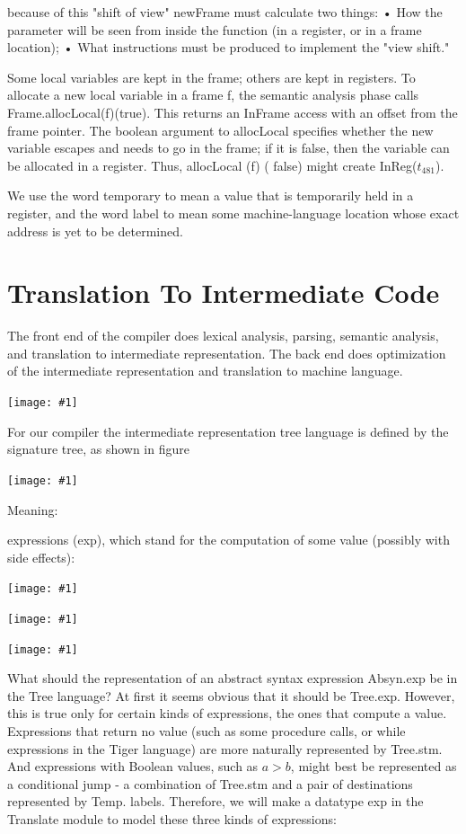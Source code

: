 \documentclass[8pt, a4paper, oneside, twocolumn]{extarticle}
\newcommand{\ph}[1]{
    \texttt{[image: \#1]}
}
\begin{document}
because of this "shift of view" newFrame must calculate two things:
• How the parameter will be seen from inside the function (in a register, or in a
frame location);
• What instructions must be produced to implement the "view shift."

Some local variables are kept in the frame; others are kept in registers. To
allocate a new local variable in a frame f, the semantic analysis phase calls
Frame.allocLocal(f)(true). This returns an InFrame access with an offset from the frame pointer.
The boolean argument to allocLocal specifies whether the new 
variable escapes and needs to go in the frame; if it is false, then the variable
can be allocated in a register. Thus, allocLocal (f) ( false) might create
InReg($t_{481}$).

We use the word
temporary to mean a value that is temporarily held in a register, and the word
label to mean some machine-language location whose exact address is yet to be determined.
\section{Translation To Intermediate Code}
The front end of the compiler does lexical analysis, parsing,
semantic analysis, and translation to intermediate representation. The back
end does optimization of the intermediate representation and translation to
machine language.

\ph{ir1}

For our compiler the intermediate representation tree language is defined by the signature tree, as shown in figure

\ph{ir2}

Meaning:

expressions (exp), which stand for the computation of some value (possibly
with side effects):

\ph{ir3}

\ph{ir4}

\ph{ir5}

What should the representation of an abstract syntax expression Absyn.exp
be in the Tree language? At first it seems obvious that it should be Tree.exp.
However, this is true only for certain kinds of expressions, the ones that 
compute a value. Expressions that return no value (such as some procedure calls,
or while expressions in the Tiger language) are more naturally represented
by Tree.stm. And expressions with Boolean values, such as $a > b$, might
best be represented as a conditional jump - a combination of Tree.stm and
a pair of destinations represented by Temp. labels.
Therefore, we will make a datatype exp in the Translate module to
model these three kinds of expressions:
\end{document}
